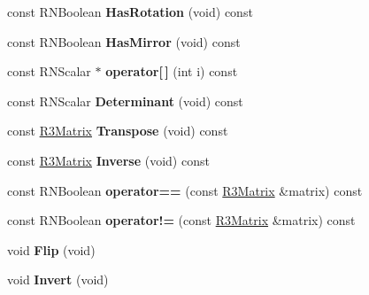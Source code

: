 \begin{DoxyCompactItemize}
\item 
const R\+N\+Boolean {\bfseries Has\+Rotation} (void) const \hypertarget{class_r3_matrix_acdaf3793d0ed307a667c6d2a998a090e}{}\label{class_r3_matrix_acdaf3793d0ed307a667c6d2a998a090e}

\item 
const R\+N\+Boolean {\bfseries Has\+Mirror} (void) const \hypertarget{class_r3_matrix_ac6bbc656edd59822526365612840fea2}{}\label{class_r3_matrix_ac6bbc656edd59822526365612840fea2}

\item 
const R\+N\+Scalar $\ast$ {\bfseries operator\mbox{[}$\,$\mbox{]}} (int i) const \hypertarget{class_r3_matrix_a0d978a68d81255531b62cd7f045b1920}{}\label{class_r3_matrix_a0d978a68d81255531b62cd7f045b1920}

\item 
const R\+N\+Scalar {\bfseries Determinant} (void) const \hypertarget{class_r3_matrix_a8ce7cf291f0cadafe08928873af0045f}{}\label{class_r3_matrix_a8ce7cf291f0cadafe08928873af0045f}

\item 
const \hyperlink{class_r3_matrix}{R3\+Matrix} {\bfseries Transpose} (void) const \hypertarget{class_r3_matrix_a90d380b728dcdc3fc7c4cfc03af2b5da}{}\label{class_r3_matrix_a90d380b728dcdc3fc7c4cfc03af2b5da}

\item 
const \hyperlink{class_r3_matrix}{R3\+Matrix} {\bfseries Inverse} (void) const \hypertarget{class_r3_matrix_a5d873d4dc9d6093034ad1838812722a7}{}\label{class_r3_matrix_a5d873d4dc9d6093034ad1838812722a7}

\item 
const R\+N\+Boolean {\bfseries operator==} (const \hyperlink{class_r3_matrix}{R3\+Matrix} \&matrix) const \hypertarget{class_r3_matrix_a262aaf12efdc03977d8042d21ea38319}{}\label{class_r3_matrix_a262aaf12efdc03977d8042d21ea38319}

\item 
const R\+N\+Boolean {\bfseries operator!=} (const \hyperlink{class_r3_matrix}{R3\+Matrix} \&matrix) const \hypertarget{class_r3_matrix_af8fae6c03a53fbe1e372f08eb8055206}{}\label{class_r3_matrix_af8fae6c03a53fbe1e372f08eb8055206}

\item 
void {\bfseries Flip} (void)\hypertarget{class_r3_matrix_adab13804223f47f3ddbd9a16f989100e}{}\label{class_r3_matrix_adab13804223f47f3ddbd9a16f989100e}

\item 
void {\bfseries Invert} (void)\hypertarget{class_r3_matrix_a15df9d3f499255462b9840ff1a71906f}{}\label{class_r3_matrix_a15df9d3f499255462b9840ff1a71906f}


\end{DoxyCompactItemize}
